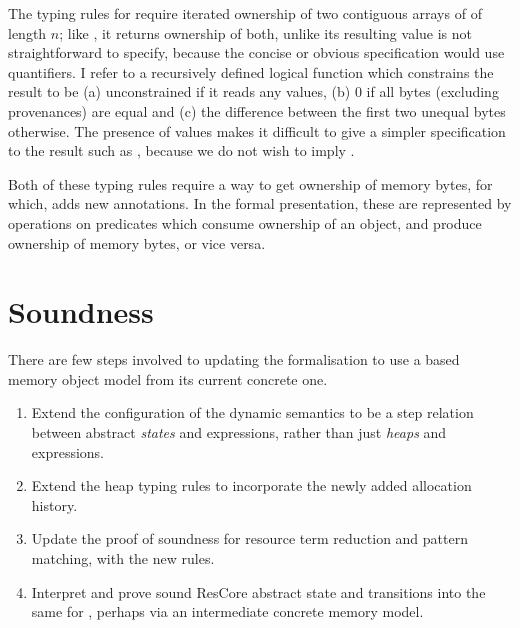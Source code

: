 The typing rules for  require iterated ownership of two
contiguous arrays of  of length $n$; like , it
returns ownership of both, unlike  its resulting value is not
straightforward to specify, because the concise or obvious specification would
use quantifiers. I refer to a recursively defined logical function which
constrains the result to be (a) unconstrained if it reads any
 values, (b) 0 if all bytes (excluding provenances) are equal
and (c) the difference between the first two unequal bytes otherwise. The presence
of  values makes it difficult to give a simpler specification
to the result such as , because we do not wish to imply %
.

Both of these typing rules require a way to get ownership of memory bytes, for
which,  adds new annotations.
In the formal presentation, these are represented by operations on predicates
which consume ownership of an object, and produce ownership of memory bytes, or
vice versa.

\section{Soundness}\label{sec:cn-vip-soundness}

There are few steps involved to updating the formalisation to use a 
based memory object model from its current concrete one.
\begin{enumerate}
    \item Extend the configuration of the dynamic semantics to be a step
        relation between abstract \emph{states} and expressions, rather than
        just \emph{heaps} and expressions.
    \item Extend the heap typing rules to incorporate the newly added
        allocation history.
    \item Update the proof of soundness for resource term reduction and pattern
        matching, with the new rules.
    \item Interpret and prove sound ResCore abstract state and transitions into
        the same for , perhaps via an intermediate concrete
        memory model.
\end{enumerate}

